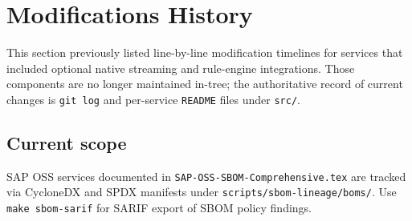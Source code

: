 
\section{Modifications History}

This section previously listed line-by-line modification timelines for services
that included optional native streaming and rule-engine integrations. Those
components are no longer maintained in-tree; the authoritative record of
current changes is \texttt{git log} and per-service \texttt{README} files under
\texttt{src/}.

\subsection{Current scope}

SAP OSS services documented in \texttt{SAP-OSS-SBOM-Comprehensive.tex} are
tracked via CycloneDX and SPDX manifests under
\texttt{scripts/sbom-lineage/boms/}. Use \texttt{make sbom-sarif} for SARIF
export of SBOM policy findings.
